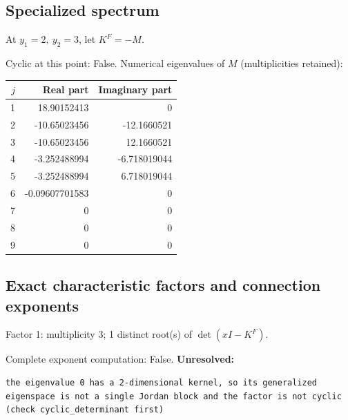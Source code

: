 \documentclass[10pt,a4paper]{article}
\newcommand{\fitmath}[1]{\sbox{\mathbox}{$\displaystyle #1$}\ifdim\wd\mathbox>\linewidth\resizebox{\linewidth}{!}{\usebox{\mathbox}}\else\usebox{\mathbox}\fi}
\begin{document}
\subsection*{Specialized spectrum}
At $y_1=2,\ y_2=3$, let $K^F=-M$.
\begin{center}\fitmath{\Delta=0}\end{center}
Cyclic at this point: False.
Numerical eigenvalues of $M$ (multiplicities retained):
\begin{center}\small\begin{tabular}{rrr}\toprule $j$ & Real part & Imaginary part\\\midrule
1 & 18.90152413 & 0\\
2 & -10.65023456 & -12.1660521\\
3 & -10.65023456 & 12.1660521\\
4 & -3.252488994 & -6.718019044\\
5 & -3.252488994 & 6.718019044\\
6 & -0.09607701583 & 0\\
7 & 0 & 0\\
8 & 0 & 0\\
9 & 0 & 0\\
\bottomrule\end{tabular}\end{center}
\subsection*{Exact characteristic factors and connection exponents}
Factor 1: multiplicity 3; 1 distinct root(s) of $\det(xI-K^F)$.
\begin{center}\fitmath{\begin{aligned}p_{1}(x)&=x\end{aligned}}\end{center}
Complete exponent computation: False.
\textbf{Unresolved:}

\begin{lstlisting}
the eigenvalue 0 has a 2-dimensional kernel, so its generalized eigenspace is not a single Jordan block and the factor is not cyclic (check cyclic_determinant first)
\end{lstlisting}
\end{document}
